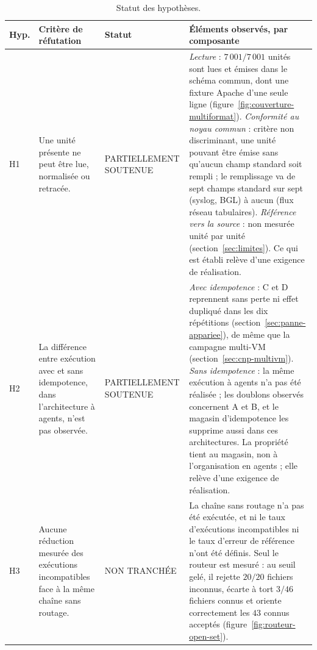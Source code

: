 \begin{table}[H]

\centering

\caption{Statut des hypothèses.}

\label{tab:statut-hypotheses}

\scriptsize
\begin{tabularx}{\textwidth}{p{} p{} p{} X}

\toprule

\textbf{Hyp.} & \textbf{Critère de réfutation} & \textbf{Statut} & \textbf{Éléments observés, par composante} \\

\midrule

H1 & Une unité présente ne peut être lue, normalisée ou retracée. &
PARTIELLEMENT SOUTENUE &
\textit{Lecture} : $7\,001/7\,001$ unités sont lues et émises dans le schéma commun, dont une fixture Apache d'une seule ligne (figure~\ref{fig:couverture-multiformat}). \textit{Conformité au noyau commun} : critère non discriminant, une unité pouvant être émise sans qu'aucun champ standard soit rempli ; le remplissage va de sept champs standard sur sept (syslog, BGL) à aucun (flux réseau tabulaires). \textit{Référence vers la source} : non mesurée unité par unité (section~\ref{sec:limites}). Ce qui est établi relève d'une exigence de réalisation. \\

H2 & La différence entre exécution avec et sans idempotence, dans l'architecture à agents, n'est pas observée. &
PARTIELLEMENT SOUTENUE &
\textit{Avec idempotence} : C et D reprennent sans perte ni effet dupliqué dans les dix répétitions (section~\ref{sec:panne-appariee}), de même que la campagne multi-VM (section~\ref{sec:cnp-multivm}). \textit{Sans idempotence} : la même exécution à agents n'a pas été réalisée ; les doublons observés concernent A et B, et le magasin d'idempotence les supprime aussi dans ces architectures. La propriété tient au magasin, non à l'organisation en agents ; elle relève d'une exigence de réalisation. \\

H3 & Aucune réduction mesurée des exécutions incompatibles face à la même chaîne sans routage. &
NON TRANCHÉE &
La chaîne sans routage n'a pas été exécutée, et ni le taux d'exécutions incompatibles ni le taux d'erreur de référence n'ont été définis. Seul le routeur est mesuré : au seuil gelé, il rejette $20/20$ fichiers inconnus, écarte à tort $3/46$ fichiers connus et oriente correctement les $43$ connus acceptés (figure~\ref{fig:routeur-open-set}). \\


\end{tabularx}
\end{table}
